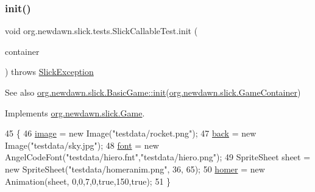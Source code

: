 \subsubsection{\texorpdfstring{init()}{init()}}
{\footnotesize\ttfamily void org.\+newdawn.\+slick.\+tests.\+Slick\+Callable\+Test.\+init (\begin{DoxyParamCaption}\item[{\mbox{\hyperlink{classorg_1_1newdawn_1_1slick_1_1_game_container}{Game\+Container}}}]{container }\end{DoxyParamCaption}) throws \mbox{\hyperlink{classorg_1_1newdawn_1_1slick_1_1_slick_exception}{Slick\+Exception}}\hspace{0.3cm}{\ttfamily [inline]}}

\begin{DoxySeeAlso}{See also}
\mbox{\hyperlink{classorg_1_1newdawn_1_1slick_1_1_basic_game_a8af0900217e4d389249f71367b22d114}{org.\+newdawn.\+slick.\+Basic\+Game\+::init}}(\mbox{\hyperlink{classorg_1_1newdawn_1_1slick_1_1_game_container}{org.\+newdawn.\+slick.\+Game\+Container}}) 
\end{DoxySeeAlso}


Implements \mbox{\hyperlink{interfaceorg_1_1newdawn_1_1slick_1_1_game_ad2dd6affab08bb8fdb5fab0815957b7a}{org.\+newdawn.\+slick.\+Game}}.


\begin{DoxyCode}
45                                                                     \{
46         \mbox{\hyperlink{classorg_1_1newdawn_1_1slick_1_1tests_1_1_slick_callable_test_a32f74c606590f5fb810388651f838852}{image}} = \textcolor{keyword}{new} Image(\textcolor{stringliteral}{"testdata/rocket.png"});
47         \mbox{\hyperlink{classorg_1_1newdawn_1_1slick_1_1tests_1_1_slick_callable_test_a8bde07ec49e362d281166d69996bc082}{back}} = \textcolor{keyword}{new} Image(\textcolor{stringliteral}{"testdata/sky.jpg"});
48         \mbox{\hyperlink{classorg_1_1newdawn_1_1slick_1_1tests_1_1_slick_callable_test_a0854b55fb448f5c331d07f464ca45652}{font}} = \textcolor{keyword}{new} AngelCodeFont(\textcolor{stringliteral}{"testdata/hiero.fnt"},\textcolor{stringliteral}{"testdata/hiero.png"});
49         SpriteSheet sheet = \textcolor{keyword}{new} SpriteSheet(\textcolor{stringliteral}{"testdata/homeranim.png"}, 36, 65);
50         \mbox{\hyperlink{classorg_1_1newdawn_1_1slick_1_1tests_1_1_slick_callable_test_a5bc881a4311acb2afd5467c4732290cf}{homer}} = \textcolor{keyword}{new} Animation(sheet, 0,0,7,0,\textcolor{keyword}{true},150,\textcolor{keyword}{true});
51     \}
\end{DoxyCode}
\mbox{\label{classorg_1_1newdawn_1_1slick_1_1tests_1_1_slick_callable_test_a2fec99c0773138e5b1de5b79fc37fa65}} 
